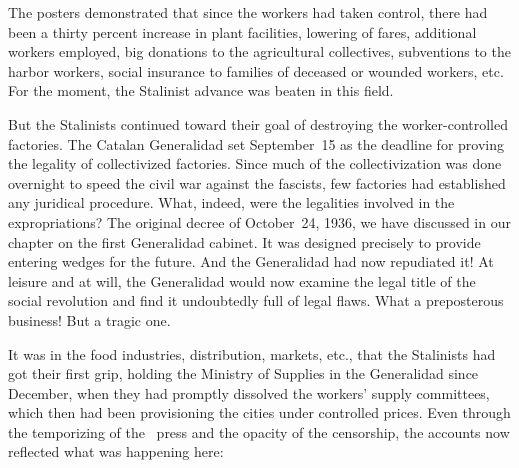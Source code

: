 \medskip

The posters demonstrated that since the workers had taken control, there had been a thirty percent increase in plant facilities, lowering of fares, additional workers employed, big donations to the agricultural collectives, subventions to the harbor workers, social insurance to families of deceased or wounded workers, etc. For the moment, the Stalinist advance was beaten in this field.

But the Stalinists continued toward their goal of destroying the worker-controlled factories. The Catalan Generalidad set September~15 as the deadline for proving the legality of collectivized factories. Since much of the collectivization was done overnight to speed the civil war against the fascists, few factories had established any juridical procedure. What, indeed, were the legalities involved in the expropriations? The original decree of October~24, 1936, we have discussed in our chapter on the first Generalidad cabinet. It was designed precisely to provide entering wedges for the future. And the Generalidad had now repudiated it! At leisure and at will, the Generalidad would now examine the legal title of the social revolution and find it undoubtedly full of legal flaws. What a preposterous business! But a tragic one.

It was in the food industries, distribution, markets, etc., that the Stalinists had got their first grip, holding the Ministry of Supplies in the Generalidad since December, when they had promptly dissolved the workers’ supply committees, which then had been provisioning the cities under controlled prices. Even through the temporizing of the \CNT\ press and the opacity of the censorship, the accounts now reflected what was happening here:

